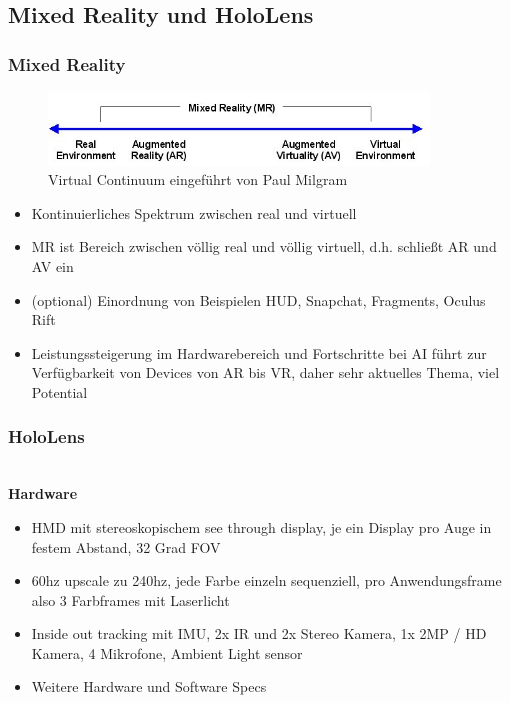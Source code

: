 \subsection{Mixed Reality und HoloLens}
\label{sec-2-1}

\subsubsection{Mixed Reality}
\label{sec-2-1-1}

\begin{figure}[h!]
	\centering
	\includegraphics[width=0.9\textwidth]{images/virtual_continuum.png}
	\caption{Virtual Continuum eingeführt von Paul Milgram \cite{Milgram94}}
	\label{img:virtual_continuum}
\end{figure}

\begin{itemize}
	\item Kontinuierliches Spektrum zwischen real und virtuell
	\item MR ist Bereich zwischen völlig real und völlig virtuell, d.h. schließt AR und AV ein
	\item (optional) Einordnung von Beispielen HUD, Snapchat, Fragments, Oculus Rift
	\item Leistungssteigerung im Hardwarebereich und Fortschritte bei AI führt zur Verfügbarkeit von Devices von AR bis VR, daher sehr aktuelles Thema, viel Potential
\end{itemize}


\subsubsection{HoloLens}
\label{sec-2-1-2}
\\

\textbf{Hardware}\\
\begin{itemize}
	\item HMD mit stereoskopischem see through display, je ein Display pro Auge in festem Abstand, 32 Grad FOV
	\item 60hz upscale zu 240hz, jede Farbe einzeln sequenziell, pro Anwendungsframe also 3 Farbframes mit Laserlicht
	\item Inside out tracking mit IMU, 2x IR und 2x Stereo Kamera, 1x 2MP / HD Kamera, 4 Mikrofone, Ambient Light sensor
	\item Weitere Hardware und Software Specs
\end{itemize}	

